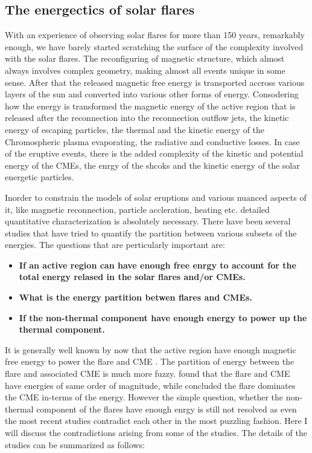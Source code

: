 \subsection{The energectics of solar flares}\label{sol_flr_energ}

With an experience of observing solar flares for more than 150 years, remarkably enough, we have barely started scratching the surface of the complexity involved with the solar flares. The reconfiguring of magnetic structure, which almost always involves complex geometry, making almost all events unique in some sense. After that the released magnetic free energy is transported accross various layers of the sun and converted into various other forms of energy. Consodering how the energy is transformed the magnetic energy of the active region that is released after the reconnection into the reconnection outflow jets, the kinetic energy of escaping particles, the thermal and the kinetic energy of the Chromospheric plasma evaporating, the radiative and conductive losses. In case of the eruptive events, there is the added complexity of the kinetic and potential energy of the CMEs, the enrgy of the shcoks and the kinetic energy of the solar energetic particles. 

Inorder to constrain the models of solar eruptions and various nuanced aspects of it, like magnetic reconnection, particle accleration, heating etc. detailed quantitative characterization is absolutely necessary. There have been several studies that have tried to quantify the partition between various subsets of the energies. The questions that are perticularly important are:

\begin{itemize}
    \item \textbf{If an active region can have enough free enrgy to account for the total energy relased in the solar flares and/or CMEs.}
    \item \textbf{What is the energy partition betwen flares and CMEs.}
    \item \textbf{If the non-thermal component have enough energy to power up the thermal component.}
\end{itemize}

It is generally well known by now that the active region have enough magnetic free energy to power the flare and CME \citep{emslie12,ash17}. The partition of energy between the flare and associated CME is much more fuzzy. \cite{emslie12} found that the flare and CME have energies of same order of magnitude, while \cite{ash17} concluded the flare dominates the CME in-terms of the energy. However the simple question, whether the non-thermal component of the flares have enough enrgy is still not resolved as even the most recent studies contradict each other in the most puzzling fashion. Here I will discuss the contradictions arising from some of the studies\citep{stosire07,emslie12,inglis14,warmuth16a,warmuth16b,ash17}. The details of the studies can be summarized as follows:

